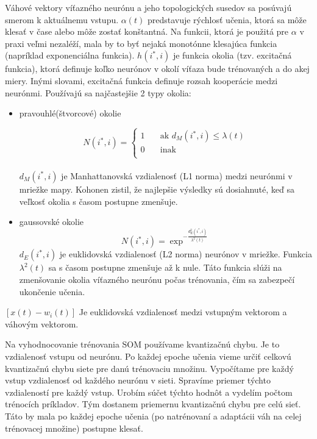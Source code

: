 Váhové vektory víťazného neurónu a jeho topologických susedov sa posúvajú smerom k aktuálnemu vstupu.
$\alpha(t)$ predstavuje rýchlosť učenia, ktorá sa môže klesať v čase alebo môže zostať konštantná. Na funkcii, ktorá je použitá pre $\alpha$ v praxi veľmi nezaléží, mala by to byť nejaká monotónne klesajúca funkcia (napríklad exponenciálna funkcia). 
$h(i^*, i)$ je funkcia okolia (tzv. excitačná funkcia), ktorá definuje koľko neurónov v okolí víťaza bude trénovaných a do akej miery. Inými slovami, excitačná funkcia definuje rozsah kooperácie medzi neurónmi. Používajú sa najčastejšie 2 typy okolia:
\begin{itemize}
\item pravouhlé(štvorcové) okolie

\[
N(i^{*},i) =
     \begin{cases}
       \text{1} &\quad\text{ak } d_{M}(i^*, i) \leq \lambda(t) \\
       \text{0} &\quad\text{inak}\\
     \end{cases}
\]
\\
$d_{M}(i^{*}, i)$ je Manhattanovská vzdialenosť (L1 norma) medzi neurónmi v mriežke mapy. Kohonen zistil, že najlepšie výsledky sú dosiahnuté, keď
sa veľkosť okolia s časom postupne zmenšuje.
\item gaussovské okolie
	\begin{equation}
		N(i^{*}, i) = \exp^{- \frac{d^{2}_{E}(i^{*}, i)}{\lambda^{2}(t)}}
	\end{equation}
$d_{E}(i^{*}, i)$ je euklidovská vzdialenosť (L2 norma) neurónov v mriežke. Funkcia $\lambda^2(t)$ sa s časom postupne zmenšuje až k nule. Táto
	funkcia slúži na zmenšovanie okolia víťazného neurónu počas trénovania, čím sa zabezpečí ukončenie učenia.
\end{itemize}

$[x(t) - w_i(t)]$ Je euklidovská vzdialenosť medzi vstupným vektorom a váhovým vektorom.

Na vyhodnocovanie trénovania SOM používame kvantizačnú chybu. Je to vzdialenosť vstupu
od neurónu. 
Po každej epoche učenia vieme určiť celkovú kvantizačnú chybu siete pre danú trénovaciu množinu.
Vypočítame pre každý vstup vzdialenosť od každého neurónu v sieti. Spravíme priemer týchto vzdialeností pre každý vstup. Urobím súčet týchto hodnôt a vydelím počtom trénocích príkladov. 
Tým dostanem priemernu kvantizačnú chybu pre celú sieť. 
Táto by mala po každej epoche učenia (po natrénovaní a adaptácii váh na celej trénovacej množine) postupne klesať.

